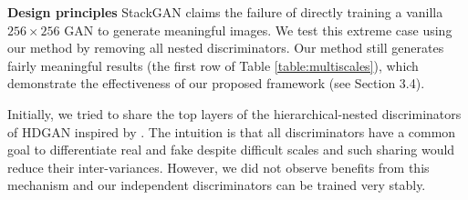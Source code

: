 \documentclass[10pt,twocolumn,letterpaper]{article}
\begin{document}



\textbf{Design principles} StackGAN claims the failure of directly training a vanilla $256{\times}256$ GAN to generate meaningful images. 
We test this extreme case using our method by removing all nested discriminators. Our method still generates fairly meaningful results (the first row of Table \ref{table:multiscales}), which demonstrate the effectiveness of our proposed framework (see Section 3.4).

Initially, we tried to share the top layers of the hierarchical-nested discriminators of HDGAN inspired by \cite{liu2017unsupervised}. The intuition is that all discriminators have a common goal to differentiate real and fake despite difficult scales and such sharing would reduce their inter-variances. 
However, we did not observe benefits from this mechanism and our independent discriminators can be trained very stably. 
\end{document}
